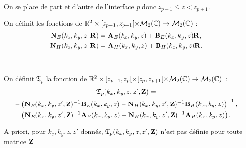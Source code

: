     On se place de part et d'autre de l'interface \(p\) donc \(z_{p-1} \le z < z_{p+1} \).

    \begin{defn}
      \label{def:plan:matrices_NE-NH}
      On définit les fonctions de \(\mathbb R^2 \times [z_{p-1},z_{p+1}[ \times \mathcal{M}_{2}(\mathbb C) \rightarrow \mathcal{M}_{2}(\mathbb C)\) :
      \begin{align*}
        \mathbf{N}_{E}(k_x,k_y,z,\mathbf{R}) &= \mathbf{A}_{E}(k_x,k_y,z) + \mathbf{B}_{E}(k_x,k_y,z)\mathbf{R},
        \\
        \mathbf{N}_{H}(k_x,k_y,z,\mathbf{R}) &= \mathbf{A}_{H}(k_x,k_y,z) + \mathbf{B}_{H}(k_x,k_y,z)\mathbf{R}.
      \end{align*}
    \end{defn}

    \begin{defn}%
      \label{def:plan:transfert:reflexion}{}~

      On définit \(\mathfrak{T}_p\) la fonction de \(\mathbb R^2 \times [z_{p-1}, z_p[\times[z_p, z_{p+1}[\times\mathcal{M}_2(\mathbb C)\rightarrow \mathcal{M}_{2}(\mathbb C)\) :
      \begin{multline*}
        \mathfrak{T}_p(k_x,k_y,z,z',\mathbf{Z}) = \\
          -\left(\mathbf{N}_{E}(k_x,k_y,z',\mathbf{Z})^{-1}\mathbf{B}_{E}(k_x,k_y,z) - \mathbf{N}_{H}(k_x,k_y,z',\mathbf{Z})^{-1}\mathbf{B}_{H}(k_x,k_y,z)\right)^{-1},
          \\
          \left(\mathbf{N}_{E}(k_x,k_y,z',\mathbf{Z})^{-1}\mathbf{A}_{E}(k_x,k_y,z) - \mathbf{N}_{H}(k_x,k_y,z',\mathbf{Z})^{-1}\mathbf{A}_{H}(k_x,k_y,z)\right).
      \end{multline*}
    \end{defn}
    A priori, pour \(k_x,k_y,z,z'\) donnés, \(\mathfrak{T}_p(k_x,k_y,z,z',\mathbf{Z})\) n'est pas définie pour toute matrice \(\mathbf{Z}\).

